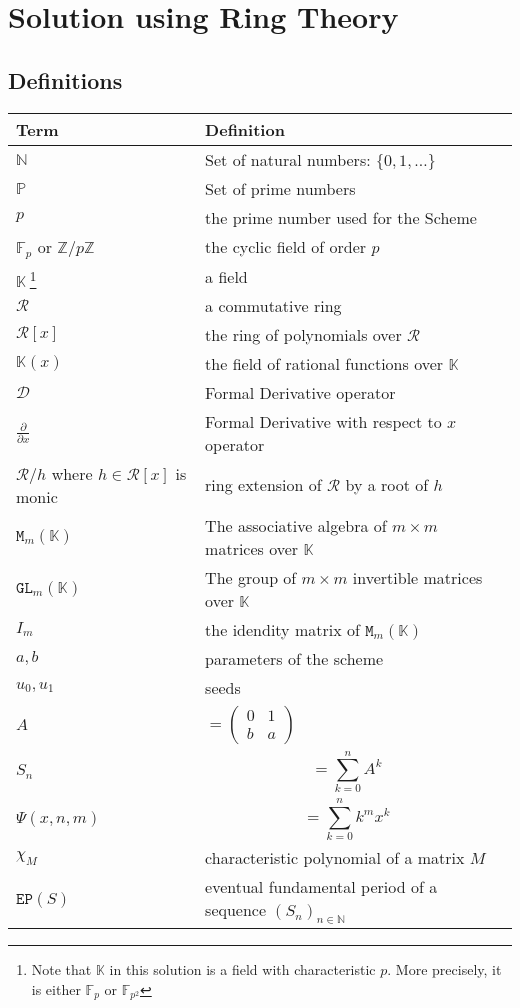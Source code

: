 \documentclass[]{article}
\begin{document}
\section{Solution using Ring Theory}
\subsection{Definitions}
\begin{tabularx}{0.8\textwidth} { 
		| >{\raggedright\arraybackslash}X 
		| >{\centering\arraybackslash}X 
		| >{\raggedleft\arraybackslash}X | }
	\hline
	Term & Definition \\
	\hline
	$\mathbb{N}$ & Set of natural numbers: $\{0,1,\dots\}$  \\
	\hline
	
	$\mathbb{P}$ & Set of prime numbers  \\
	\hline
	$p$ & the prime number used for the Scheme  \\
	\hline
	$\mathbb{F}_p$  or $\mathbb{Z}/p\mathbb{Z}$ & the cyclic field of order $p$  \\
	\hline
	$\mathbb{K} \ $\footnote{Note that $\mathbb{K}$ in this solution is a field with characteristic $p.$ More precisely, it is either $\mathbb{F}_p$ or $\mathbb{F}_{p^2}$} & a field  \\
	\hline
	$\mathcal{R}$ & a commutative ring  \\
	\hline
	$\mathcal{R}[x]$ & the ring of polynomials over $\mathcal{R}$  \\
	\hline
	$\mathbb{K}(x)$ & the field of rational functions over $\mathbb{K}$  \\
	\hline
	$\mathcal{D}$ & Formal Derivative operator  \\
	\hline
	$\frac{\partial}{\partial x}$ & Formal Derivative with respect to $x$ operator  \\
	\hline
	$\mathcal{R}/h$ where $h\in\mathcal{R}[x]$ is monic  & ring extension of $\mathcal{R}$ by a root of $h$  \\
	\hline
	$\mathtt{M}_m(\mathbb{K})$ & The associative algebra of $m\times m$ matrices over $\mathbb{K}$  \\
	\hline
	$\mathtt{GL}_m(\mathbb{K})$ & The group of $m\times m$ invertible matrices over $\mathbb{K}$  \\
	\hline
	$I_m$ & the idendity matrix of 	$\mathtt{M}_m(\mathbb{K})$ \\
	\hline
	$a,b$ & parameters of the scheme \\
	\hline
	$u_0,u_1$ & seeds \\
	\hline
	$A$ & $=\begin{pmatrix} 0&1 \\ b&a\end{pmatrix}$ \\
	\hline
	$S_n$ & $$=\sum_{k=0}^n A^k$$ \\
	\hline
	$\Psi(x,n,m)$ & $$=\sum_{k=0}^nk^mx^k$$\\
	\hline
	$\chi_M$ & characteristic polynomial of a matrix $M$  \\
	\hline
	$\mathtt{EP}(S)$ & eventual fundamental period of a sequence $(S_n)_{n\in\mathbb{N}}$  \\
	\hline
\end{tabularx}
\end{document}
